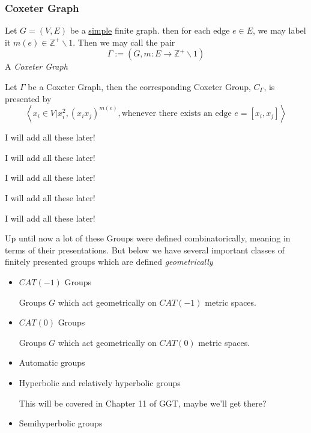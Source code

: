 \subsubsection{Coxeter Graph}
\begin{definition}
    Let $G=(V,E)$ be a \href{https://mathworld.wolfram.com/SimpleGraph.html}{simple} finite graph. then for each edge $e\in E$, we may label it $m(e)\in\mathbb{Z}^+\backslash1$. Then we may call the pair
    \[\Gamma :=(G,m:E\to \mathbb{Z}^+\backslash1)\]
    A \textit{Coxeter Graph}
\end{definition}
\begin{example}
    Let $\Gamma$ be a Coxeter Graph, then the corresponding Coxeter Group, $C_\Gamma$, is presented by
    \[\left\langle x_i\in V|x^2_i,(x_ix_j)^{m(e)}, \text{whenever there exists an edge }e=[x_i,x_j]\right\rangle\]
\end{example}
\begin{example}
    I will add all these later!
\end{example}
\begin{example}
    I will add all these later!
\end{example}
\begin{example}
    I will add all these later!
\end{example}
\begin{example}
    I will add all these later!
\end{example}
\begin{example}
I will add all these later!
\end{example}
Up until now a lot of these Groups were defined combinatorically, meaning in terms of their presentations. But below we have several important classes of finitely presented groups which are defined \textit{geometrically}
\begin{itemize}
    \item $CAT(-1)$ Groups
    
    Groups $G$ which act geometrically on $CAT(-1)$ metric spaces.
    \item $CAT(0)$ Groups
    
    Groups $G$ which act geometrically on $CAT(0)$ metric spaces.
    \item Automatic groups
    \item Hyperbolic and relatively hyperbolic groups

    This will be covered in Chapter 11 of GGT, maybe we'll get there?

    \item Semihyperbolic groups
\end{itemize}
